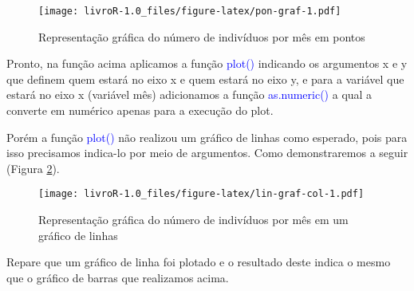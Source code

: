 \documentclass[titlepage, oneside, openany, a4paper]{book}
\newenvironment{Shaded}{\begin{snugshade}}{\end{snugshade}}
\newcommand{\DataTypeTok}[1]{\textcolor[rgb]{0.13,0.29,0.53}{#1}}
\newcommand{\KeywordTok}[1]{\textcolor[rgb]{0.13,0.29,0.53}{\textbf{#1}}}
\newcommand{\NormalTok}[1]{#1}
\newcommand{\OperatorTok}[1]{\textcolor[rgb]{0.81,0.36,0.00}{\textbf{#1}}}
\newcommand{\StringTok}[1]{\textcolor[rgb]{0.31,0.60,0.02}{#1}}
\begin{document}
\begin{Shaded}
\end{Shaded}

\begin{figure}
\centering
\texttt{[image: livroR-1.0\_files/figure-latex/pon-graf-1.pdf]}
\caption{\label{fig:pon-graf}Representação gráfica do número de indivíduos por mês em pontos}
\end{figure}

Pronto, na função acima aplicamos a função \textcolor{blue}{plot()} indicando os argumentos x e y que definem quem estará no eixo x e quem estará no eixo y, e para a variável que estará no eixo x (variável mês) adicionamos a função \textcolor{blue}{as.numeric()} a qual a converte em numérico apenas para a execução do plot.

Porém a função \textcolor{blue}{plot()} não realizou um gráfico de linhas como esperado, pois para isso precisamos indica-lo por meio de argumentos. Como demonstraremos a seguir (Figura \ref{fig:lin-graf-col}).

\begin{Shaded}
\end{Shaded}

\begin{figure}
\centering
\texttt{[image: livroR-1.0\_files/figure-latex/lin-graf-col-1.pdf]}
\caption{\label{fig:lin-graf-col}Representação gráfica do número de indivíduos por mês em um gráfico de linhas}
\end{figure}

Repare que um gráfico de linha foi plotado e o resultado deste indica o mesmo que o gráfico de barras que realizamos acima.
\end{document}
